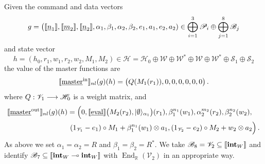 \documentclass[english,letter paper,12pt,leqno]{article}
\theoremstyle{example}
\numberwithin{equation}{section}
\def\be{\begin{equation}}
\def\ee{\end{equation}}
\DeclareMathOperator{\End}{End}
\begin{document}
Given the command and data vectors
\[
g = \big( \llbracket \underline{n}_1 \rrbracket, \llbracket \underline{m}_2 \rrbracket, \llbracket \underline{n}_2 \rrbracket, \alpha_1, \beta_1, \alpha_2, \beta_2, e_1, a_1, e_2, a_2 ) \in \bigoplus_{i=1}^3 \mathscr{P}_i \oplus \bigoplus_{j=1}^8 \mathscr{B}_j
\]
and state vector
\be\label{eq:patternntm_state}
h = (h_0, r_1, w_1, r_2, w_2, M_1, M_2) \in \mathscr{H} = \mathscr{H}_0 \oplus \mathscr{W} \oplus \mathscr{W}^* \oplus \mathscr{W} \oplus \mathscr{W}^* \oplus \mathscr{S}_1 \oplus \mathscr{S}_2
\ee
the value of the master functions are
\[
\llbracket \underline{\textup{master}}^{\mathrm{in}} \rrbracket_{nl}(g)(h)
= \big(Q(M_1(r_1)), 0, 0, 0, 0, 0, 0 \big)\,.
\]
where $Q: \mathscr{V}_1 \longrightarrow \mathscr{H}_0$ is a weight matrix, and
\begin{align*}
\llbracket \underline{\textup{master}}^{\mathrm{out}} \rrbracket_{nl}&(g)(h) = \Big( 0, \llbracket \underline{\mathrm{eval}} \rrbracket\big( M_2(r_2), \lvert\emptyset\rangle_{\alpha_1} \big)(r_1), \beta_1^{n_1}(w_1), \alpha_2^{m_2}(r_2), \beta_2^{n_2}(w_2),\\
&\qquad \quad (1_{\mathscr{V}_1} - e_1) \circ M_1 + \beta_1^{n_1}(w_1) \otimes a_1, (1_{\mathscr{V}_2} - e_2) \circ M_2 + w_2 \otimes a_2 \Big)\,.
\end{align*}
As above we set $\alpha_1 = \alpha_2 = R$ and $\beta_1 = \beta_2 = R^*$. We take $\mathscr{B}_8 = \mathscr{V}_2 \subseteq \llbracket \textbf{int}_W \rrbracket$ and identify $\mathscr{B}_7 \subseteq \llbracket \textbf{int}_W \multimap \textbf{int}_W \rrbracket$ with $\End_{\mathbb{R}}(\mathscr{V}_2)$ in an appropriate way.
\end{document}
